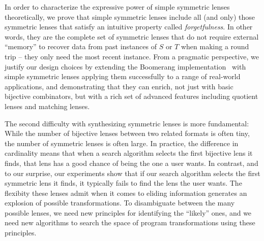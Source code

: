 \documentclass[acmsmall,screen,anonymous]{acmart}
\begin{document}
In order to characterize the expressive power of simple symmetric lenses
theoretically, we prove that simple symmetric lenses include all (and only)
those symmetric lenses that satisfy an intuitive property called
\emph{forgetfulness}. In other words, they are the complete set of symmetric
lenses that do not require external ``memory'' to recover data from past
instances of $S$ or $T$ when making a round trip -- they only need the most
recent instance. From a pragmatic perspective, we justify our design choices by
extending the Boomerang implementation~\cite{Boomerang} with simple symmetric
lenses applying them successfully to a range of real-world applications, and
demonstrating that they can enrich, not just with basic bijective combinators,
but with a rich set of advanced features including quotient lenses and matching
lenses.

The second difficulty with synthesizing symmetric lenses is more
fundamental: While the number of bijective lenses between two
related formats is often tiny, the number of symmetric lenses is often large. In
practice, the difference in cardinality means that when a search algorithm
selects the first bijective lens it finds, that lens has a good chance of being
the one a user wants. In contrast, and to our surprise, our experiments show
that if our search algorithm selects the first symmetric lens it finds, it
typically fails to find the lens the user wants. The flexibity these lenses
admit when it comes to eliding information generates an explosion of possible
transformations. To disambiguate between the many possible lenses, we need new
principles for identifying the ``likely'' ones, and we need new algorithms to
search the space of program transformations using these principles. 
\end{document}
